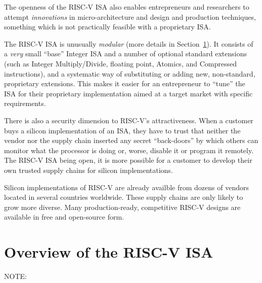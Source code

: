 The openness of the RISC-V ISA also enables entrepreneurs and
researchers to attempt \emph{innovations} in micro-architecture and
design and production techniques, something which is not practically
feasible with a proprietary ISA.

The RISC-V ISA is unusually \emph{modular} (more details in
Section~\ref{Sec_ISA_Overview}).  It consists of a \emph{very} small
``base'' Integer ISA and a number of optional standard extensions
(such as Integer Multiply/Divide, floating point, Atomics, and
Compressed instructions), and a systematic way of substituting or
adding new, non-standard, proprietary extensions.  This makes it
easier for an entrepreneur to ``tune'' the ISA for their proprietary
implementation aimed at a target market with specific requirements.

There is also a security dimension to RISC-V's attractiveness.  When a
customer buys a silicon implementation of an ISA, they have to trust
that neither the vendor nor the supply chain inserted any secret
``back-doors'' by which others can monitor what the processor is doing
or, worse, disable it or program it remotely.  The RISC-V ISA being
open, it is more possible for a customer to develop their own trusted
supply chains for silicon implementations.

Silicon implementations of RISC-V are already availble from dozens of
vendors located in several countries worldwide.  These supply chains
are only likely to grow more diverse.  Many production-ready,
competitive RISC-V designs are available in free and open-source form.


\section{Overview of the RISC-V ISA}

\label{Sec_ISA_Overview}


NOTE: 

